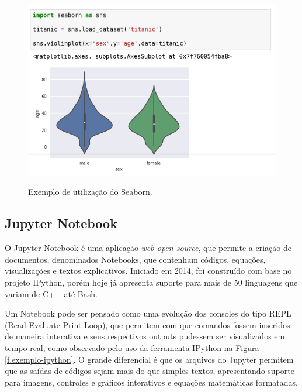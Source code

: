 \begin{figure}[h]
\caption{\small Exemplo de utilização do Seaborn.}
\centering
\includegraphics[scale=2.5]{figs/exemplo-seaborn.png}
\label{f.exemplo-seaborn}
\end{figure}

\subsection{Jupyter Notebook}
\label{ss.jupyter}

O Jupyter Notebook é uma aplicação \textit{web open-source}, que permite a criação de documentos, denominados Notebooks, que contenham códigos, equações, visualizações e textos explicativos. Iniciado em 2014, foi construído com base no projeto IPython, porém hoje já apresenta suporte para mais de 50 linguagens que variam de C++ até Bash. 

Um Notebook pode ser pensado como uma evolução dos consoles do tipo REPL (Read Evaluate Print Loop), que permitem com que comandos fossem inseridos de maneira interativa e seus respectivos outputs pudessem ser visualizados em tempo real, como observado pelo uso da ferramenta IPython na Figura \ref{f.exemplo-ipython}. O grande diferencial é que os arquivos do Jupyter permitem que as saídas de códigos sejam mais do que simples textos, apresentando suporte para imagens, controles e gráficos interativos e equações matemáticas formatadas. \cite{Kluyver:2016aa} 

